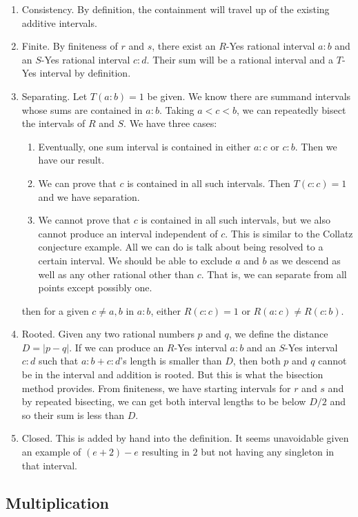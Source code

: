 \documentclass[12pt]{article}
\theoremstyle{remark}
\begin{document}
\begin{enumerate}
    \item Consistency. By definition, the containment will travel up of the existing additive intervals.
    \item Finite. By finiteness of $r$ and $s$, there exist an $R$-Yes rational interval $a:b$ and an $S$-Yes rational interval $c:d$. Their sum will be a rational interval and a $T$-Yes interval by definition.
    \item Separating. Let $T(a:b)=1$ be given. We know there are summand intervals whose sums are contained in $a:b$. Taking $a < c< b$, we can repeatedly bisect the intervals of $R$ and $S$. We have three cases: 
    \begin{enumerate}
        \item Eventually, one sum interval is contained in either $a:c$ or $c:b$. Then we have our result. 
        \item We can prove that $c$ is contained in all such intervals. Then $T(c:c) =1$ and we have separation. 
        \item We cannot prove that $c$ is contained in all such intervals, but we also cannot produce an interval independent of $c$. This is similar to the Collatz conjecture example. All we can do is talk about being resolved to a certain interval. We should be able to exclude $a$ and $b$ as we descend as well as any other rational other than $c$. That is, we can separate from all points except possibly one. 
    \end{enumerate}
    then for a given $c \neq a, b$ in $a:b$, either $R(c:c) = 1$ or $R(a:c) \neq R(c:b)$. 
    \item Rooted. Given any two rational numbers $p$ and $q$, we define the distance $D = |p-q|$. If we can produce an $R$-Yes interval $a:b$ and an $S$-Yes interval $c:d$ such that $a:b + c:d$'s length is smaller than $D$, then both $p$ and $q$ cannot be in the interval and addition is rooted. But this is what the bisection method provides. From finiteness, we have starting intervals for $r$ and $s$ and by repeated bisecting, we can get both interval lengths to be below $D/2$ and so their sum is less than $D$.
    \item Closed. This is added by hand into the definition. It seems unavoidable given an example of $(e + 2) - e$ resulting in $2$ but not having any singleton in that interval. 
\end{enumerate}




\subsection{Multiplication}
\end{document}
